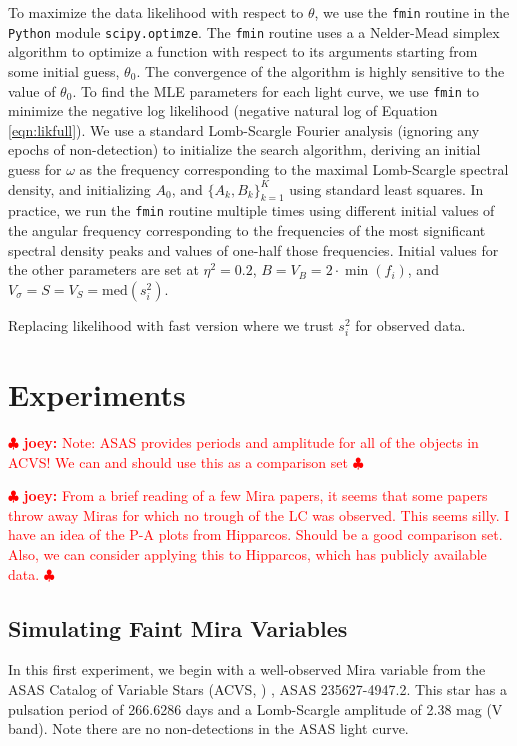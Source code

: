\documentclass[12pt,preprint]{aastex}
\newcommand{\fobs}{f_i}
\newcommand{\sobs}{s^2_i}
\newcommand{\joey}[1] { \textcolor{red} {
\ensuremath{\clubsuit} {\bf joey:}  {#1}
\ensuremath{\clubsuit} } }%
\begin{document}
To maximize the data likelihood with respect to $\theta$, we use the {\tt fmin} routine in the {\tt Python} module {\tt scipy.optimze}.  The {\tt fmin} routine uses a a Nelder-Mead simplex algorithm to optimize a function with respect to its arguments starting from some initial guess, $\theta_0$.  The convergence of the algorithm is highly sensitive to the value of $\theta_0$.  To find the MLE parameters for each light curve, we use {\tt fmin} to minimize the negative log likelihood (negative natural log of Equation \ref{eqn:likfull}).  We use a standard Lomb-Scargle Fourier analysis (ignoring any epochs of non-detection) to initialize the search algorithm, deriving an initial guess for $\omega$ as the frequency corresponding to the maximal Lomb-Scargle spectral density, and initializing $A_0$, and $\{A_k, B_k\}_{k=1}^K$ using standard least squares.  In practice, we run the {\tt fmin} routine multiple times using different initial values of the angular frequency corresponding to the frequencies of the most significant spectral density peaks and values of one-half those frequencies.  Initial values for the other parameters are set at $\eta^2 = 0.2$, $B = V_B = 2\cdot\min(\fobs)$, and $ V_{\sigma} = S = V_S = \textrm{med}(\sobs)$.



Replacing likelihood with fast version where we trust $s_i^2$ for observed data.





\section{Experiments}
\label{sec:experiments}

\joey{Note: ASAS provides periods and amplitude for all of the objects in ACVS!  We can and should use this as a comparison set}

\joey{From a brief reading of a few Mira papers, it seems that some papers throw away Miras for which no trough of the LC was observed.  This seems silly.  I have an idea of the P-A plots from Hipparcos.  Should be a good comparison set.  Also, we can consider applying this to Hipparcos, which has publicly available data.}

\subsection{Simulating Faint Mira Variables}
\label{ss:mirasim}

In this first experiment, we begin with a well-observed Mira variable from the ASAS Catalog of Variable Stars (ACVS, \citealt{acvs}) , ASAS 235627-4947.2.  This star has a pulsation period of 266.6286 days and a Lomb-Scargle amplitude of 2.38 mag (V band).  Note there are no non-detections in the ASAS light curve.
\end{document}
